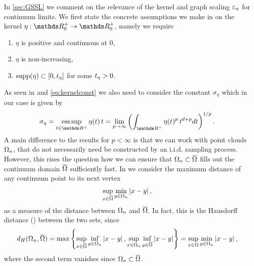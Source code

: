 %
%
In \cref{sec:GSSL} we comment on the relevance of the kernel and graph scaling $\varepsilon_n$ for continuum limits. We first state the concrete assumptions we make in \cite{roith2022continuum} on the kernel $\eta:\R_0^+\to\R_0^+$, namely we require

\begin{enumerate}[label=(K\upshape\arabic*)]
	\item\label{en:K1} $\eta$ is positive and continuous at $0$,
	\item\label{en:K2} $\eta$ is non-increasing,
	\item\label{en:K4} $\mathrm{supp}(\eta) \subset [0,t_\eta]$ for some $t_\eta>0$.
\end{enumerate}
%
As seen in \cite{GarcSlep15, slepcev2019analysis} and \cref{eq:kernelconst} we also need to consider the constant $\sigma_\eta$ which in our case is given by
%
\begin{align*}
\sigma_\eta = \esssup_{t\in \R^+} \eta(t)\, t =
\lim_{p\to\infty} \left(\int_{\R^+} \eta(t)^p\, t^{d+p} dt\right)^{1/p}.
\end{align*}
%
%
A main difference to the results for $p<\infty$ is that we can work with point clouds $\Omega_n$, that do not necessarily need be constructed by an i.i.d. sampling process. However, this rises the question how we can ensure that $\Omega_n\subset\overline{\Omega}$ fills out the continuum domain $\overline{\Omega}$ sufficiently fast. In \cite{roith2022continuum} we consider the maximum distance of any continuum point to its next vertex
%
\begin{align}\label{eq:resolution}
\sup_{x\in\overline{\Omega}} \min_{y\in\Omega_n} \left|x-y\right|,
\end{align}
%
as a measure of the distance between $\Omega_n$ and $\overline{\Omega}$. In fact, this is the Hausdorff distance (\cite{hausdorff1914}) between the two sets, since 
%
\begin{align*}
d_H(\Omega_n, \overline{\Omega}) = 
\max
\left\{
\sup_{x\in\overline{\Omega}} \inf_{y\in\Omega_n} \left|x-y\right|,  
\sup_{x\in\Omega_n} \inf_{y\in\overline{\Omega}} \left|x-y\right|
\right\} = 
\sup_{x\in\Omega} \min_{y\in\Omega_n} \left|x-y\right|,
\end{align*}
%
where the second term vanishes since $\Omega_n\subset\overline{\Omega}$.
%

